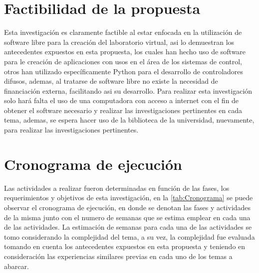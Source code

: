 \section{Factibilidad de la propuesta}

    Esta investigación es claramente factible al estar enfocada en la utilización de software libre para la creación del laboratorio virtual, asi lo demuestran los antecedentes expuestos en esta propuesta, los cuales han hecho uso de software para le creación de aplicaciones con usos en el área de los sistemas de control, otros han utilizado específicamente Python para el desarrollo de controladores difusos, ademas, al tratarse de software libre no existe la necesidad de financiación externa, facilitando asi su desarrollo. Para realizar esta investigación solo hará falta el uso de una computadora con acceso a internet con el fin de obtener el software necesario y realizar las investigaciones pertinentes en cada tema, ademas, se espera hacer uso de la biblioteca de la universidad, nuevamente, para realizar las investigaciones pertinentes.

\section{Cronograma de ejecución}

    Las actividades a realizar fueron determinadas en función de las fases, los requerimientos y objetivos de esta investigación, en la \cref{tab:Cronograma} se puede observar el cronograma de ejecución, en donde se denotan las fases y actividades de la misma junto con el numero de semanas que se estima emplear en cada una de las actividades. La estimación de semanas para cada una de las actividades se tomo considerando la complejidad del tema, a su vez, la complejidad fue evaluada tomando en cuenta los antecedentes expuestos en esta propuesta y teniendo en consideración las experiencias similares previas en cada uno de los temas a abarcar.


